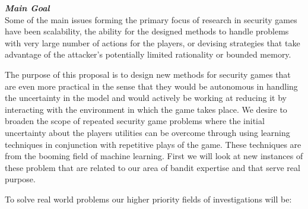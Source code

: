

\noindent \textit{\textbf{Main Goal}}\\ 

Some of the main issues forming the primary focus of research in security games have been scalability, the ability for the designed methods to handle problems with very large number of actions for the players, or devising strategies that take advantage of the attacker's potentially limited rationality or bounded memory\cite{tambe2012game}.

The purpose of this proposal is to design new methods for security games that are even more practical  in the sense that they would be autonomous in handling the uncertainty in the model and would actively be working at reducing it by interacting with the environment in which the game takes place. We desire to broaden the scope of repeated security game problems where the initial uncertainty about the players utilities can be overcome through using learning techniques  in conjunction with  repetitive plays of the game. These techniques are from the booming field of machine learning.
First we will look at new instances of these problem that are related to our area of bandit expertise and that serve real purpose.

To solve real world problems our higher priority fields of investigations will be:

